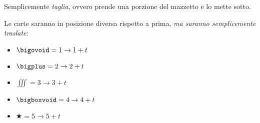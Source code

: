 \documentclass[8pt]{beamer}
\theoremstyle{plain}
\theoremstyle{definition}
\begin{document}
\begin{frame}\begin{center}
Semplicemente \textit{taglia}, ovvero prende una porzione del mazzetto e lo mette sotto.

\smallskip

Le carte saranno in posizione diversa rispetto a prima, \emph{ma saranno semplicemente traslate}:

\bigskip
\bigskip


\begin{itemize}
\item[] \begin{center} $\bigovoid = 1 \rightarrow 1+t$ \end{center}
\item[] \begin{center} $\bigplus = 2 \rightarrow 2+t$ \end{center}  
\item[] \begin{center} $\iiint =3 \rightarrow 3+t$ \end{center}
\item[] \begin{center} $\bigboxvoid =4 \rightarrow 4+t$ \end{center}
\item[] \begin{center} $\bigstar =5 \rightarrow 5+t$ \end{center}
\end{itemize}

\end{center}
\end{frame}
\end{document}
